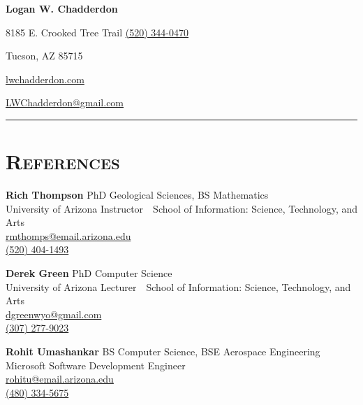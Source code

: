 \documentclass[11pt,letterpaper]{article}
\newcommand{\bsk}{\par\vspace{\baselineskip}}
\begin{document}
\begin{minipage}{\textwidth}

\begin{center}
\LARGE \bfseries Logan W. Chadderdon
\end{center}

8185 E. Crooked Tree Trail \hfill \href{tel:(520) 344-0470}{(520) 344-0470}

\vspace{-3mm}
\begin{multicols}{3}
Tucson, AZ 85715 

\begin{center}
\href{http://lwchadderdon.com}{lwchadderdon.com}
\end{center}

\hfill \href{mailto:LWChadderdon@gmail.com}{LWChadderdon@gmail.com}

\end{multicols}

\vspace{-1mm}
\hrule

\bsk
\section{\scshape References}

\bsk
{\bfseries Rich Thompson} \hfill PhD Geological Sciences, BS Mathematics\\
University of Arizona \hfill Instructor~\textbullet~School of Information: Science, Technology, and Arts\\
\href{mailto:rmthomps@email.arizona.edu}{rmthomps@email.arizona.edu}\\
\href{tel:(520) 404-1493}{(520) 404-1493}

\bsk
\bsk
{\bfseries Derek Green} \hfill PhD Computer Science\\
University of Arizona \hfill Lecturer~\textbullet~School of Information: Science, Technology, and Arts\\
\href{mailto:dgreenwyo@gmail.com}{dgreenwyo@gmail.com}\\
\href{tel:(307) 277-9023}{(307) 277-9023}

\bsk
\bsk
{\bfseries Rohit Umashankar} \hfill BS Computer Science, BSE Aerospace Engineering\\
Microsoft \hfill Software Development Engineer\\
\href{mailto:rohitu@email.arizona.edu}{rohitu@email.arizona.edu}\\
\href{tel:(480) 334-5675}{(480) 334-5675}



\end{minipage}
\end{document}

